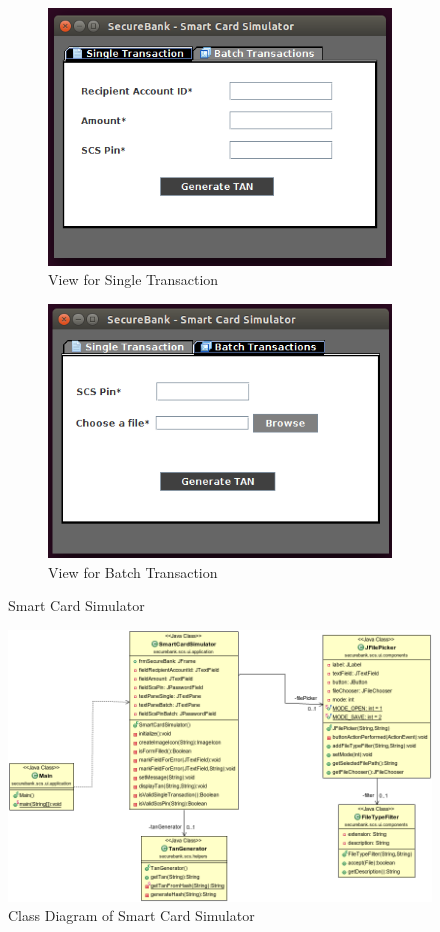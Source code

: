 \begin{figure}[ht]
	\centering
	\begin{subfigure}{.45\textwidth}
		\centering
		\includegraphics[width=.9\linewidth]{figures/scs_mode_single.png}
		\caption{View for Single Transaction}
	\end{subfigure}\hfill%
	\begin{subfigure}{.45\textwidth}
		\centering
		\includegraphics[width=.9\linewidth]{figures/scs_mode_batch.png}
		\caption{View for Batch Transaction}
	\end{subfigure}
	\caption{Smart Card Simulator}
	\label{fig:scs_modes}
\end{figure}


\begin{figure}[ht]
	\centering
	\includegraphics[width=0.9\linewidth]{figures/scs_class_diagram.png}
	\caption{Class Diagram of Smart Card Simulator}
	\label{fig:scs_class_diagram}
\end{figure}

\clearpage